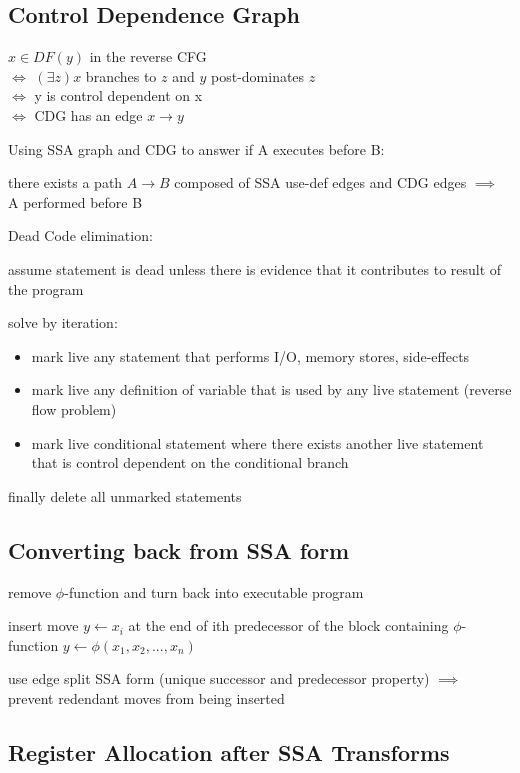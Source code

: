 \documentclass[8pt]{extarticle}
\begin{document}
\begin{multicols*}{2}
  \subsection{Control Dependence Graph}
  
  $x \in DF(y)$ in the reverse CFG\\
  $\iff$ $(\exists z) x$ branches to $z$ and $y$ post-dominates $z$\\
  $\iff$ y is control dependent on x\\
  $\iff$ CDG has an edge $x \rightarrow y$

  
  Using SSA graph and CDG to answer if A executes before B:

  there exists a path $A \rightarrow B$ composed of SSA use-def edges and CDG edges $\implies$ A performed before B
  
  Dead Code elimination:

  assume statement is dead unless there is evidence that it contributes to result of the program

  solve by iteration:
  \begin{itemize}
  \item mark live any statement that performs I/O, memory stores, side-effects
  \item mark live any definition of variable that is used by any live statement (reverse flow problem)
  \item mark live conditional statement where there exists another live statement that is control dependent on the conditional branch
  \end{itemize}

  finally delete all unmarked statements

  \subsection{Converting back from SSA form}

  remove $\phi$-function and turn back into executable program

  insert move $y \leftarrow x_i$ at the end of ith predecessor of the block containing $\phi$-function $y \leftarrow \phi(x_1, x_2,...,x_n)$

  use edge split SSA form (unique successor and predecessor property) $\implies$ prevent redendant moves from being inserted


  \subsection{Register Allocation after SSA Transforms}


\end{multicols*}
\end{document}
